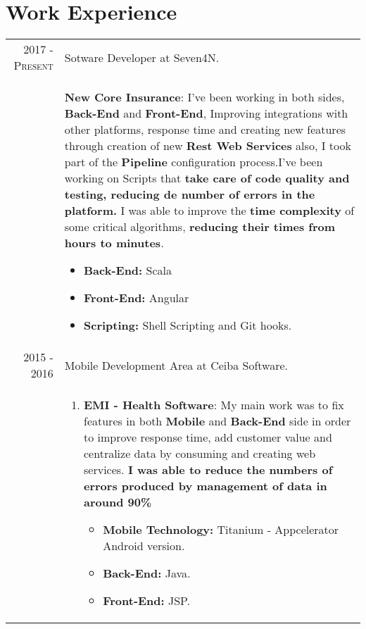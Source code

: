 \documentclass[a4paper,10pt]{article} %
\begin{document}
\section{Work Experience}

\begin{tabular}{r|p{11cm}}

\textsc{2017 - Present} & Sotware Developer at Seven4N.\\
& \footnotesize{
 \textbf{New Core Insurance}: I've been working in both sides, \textbf{Back-End} and \textbf{Front-End}, Improving integrations with other platforms, response time and creating new features through creation of new \textbf{Rest Web Services} also, I took part of the \textbf{Pipeline} configuration process.\linebreak \linebreak I've been working on Scripts that \textbf{take care of code quality and testing, reducing de number of errors in the platform.} \linebreak \linebreak I was able to improve the \textbf{time complexity} of some critical algorithms, \textbf{reducing their times from hours to minutes}. \linebreak
\begin{itemize}
\item \textbf{Back-End:} Scala
\item \textbf{Front-End:} Angular
\item \textbf{Scripting:} Shell Scripting and Git hooks.
\end{itemize}}\\
\textsc{2015 - 2016} & Mobile Development Area at Ceiba Software.\\
& \footnotesize{
\begin{enumerate}
\item \textbf{EMI - Health Software}: My main work was to fix features in both \textbf{Mobile} and \textbf{Back-End} side in order to improve response time, add customer value and centralize data by consuming and creating web services. \textbf{I was able to reduce the numbers of errors produced by management of data in around 90\%} \linebreak
\begin{itemize}
\item \textbf{Mobile Technology:} Titanium - Appcelerator Android version.
\item \textbf{Back-End:} Java.
\item \textbf{Front-End:} JSP.

\end{itemize}
\end{enumerate}}
\end{tabular}
\end{document}

